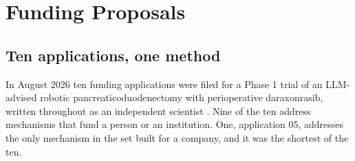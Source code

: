 \section{Funding Proposals}
\label{sec:funding}

\subsection{Ten applications, one method}

In August 2026 ten funding applications were filed for a Phase 1 trial of an
LLM-advised robotic pancreaticoduodenectomy with perioperative daraxonrasib,
written throughout as an independent scientist \cite{tenapps2026}. Nine of the
ten address mechanisms that fund a person or an institution. One, application
05, addresses the only mechanism in the set built for a company, and it was the
shortest of the ten.


